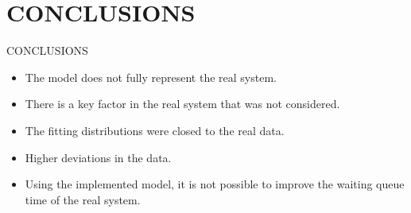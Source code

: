 \section{CONCLUSIONS}
\begin{frame}{CONCLUSIONS}
\begin{itemize}
    \item The model does not fully represent the real system.
    \item There is a key factor in the real system that was not considered.
    \item The fitting distributions were closed to the real data.
    \item Higher deviations in the data.
    \item Using the implemented model, it is not possible to improve the waiting queue time of the real system.
\end{itemize}
\end{frame}